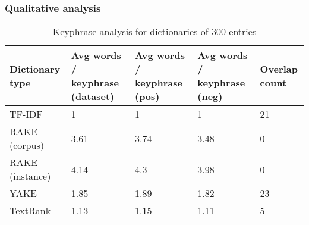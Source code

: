 \subsubsection{Qualitative analysis}
    \begin{table}[H]%
        \centering
        \begin{tabular}{|p{3cm}|p{3cm}|p{3cm}|p{3cm}|p{1.5cm}|}
        \hline
        Dictionary type& Avg words / keyphrase (dataset)& Avg words / keyphrase (pos) &Avg words / keyphrase (neg) & Overlap count\\\hline
        
        TF-IDF &1&1&1&21\\ \hline
        RAKE (corpus)&3.61&3.74&3.48&0\\ \hline
        RAKE (instance)&4.14&4.3&3.98&0\\ \hline
        YAKE&1.85&1.89&1.82&23\\ \hline
        TextRank&1.13&1.15&1.11&5\\ \hline
        
        
        \end{tabular}
        \caption{Keyphrase analysis for dictionaries of 300 entries}
        \label{tab:ke_eval}
    \end{table}

